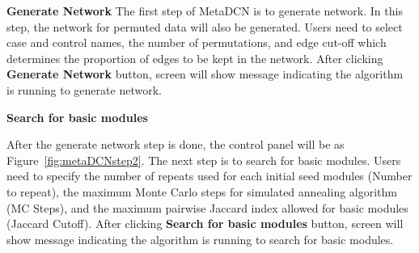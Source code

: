 \begin{steps}
\item \textbf{Generate Network}
The first step of MetaDCN is to generate network. In this step, the network for permuted data will also be generated. Users need to select case and control names, the number of permutations, and edge cut-off which determines the proportion of edges to be kept in the network. After clicking \textbf{Generate Network} button, screen will show message indicating the algorithm is running to generate network.


\item \textbf{Search for basic modules}

After the generate network step is done, the control panel will be as Figure~\ref{fig:metaDCNstep2}. The next step is to search for basic modules. Users need to specify the number of repeats used for each initial seed modules (Number to repeat), the maximum Monte Carlo steps for simulated annealing algorithm (MC Steps), and the maximum pairwise Jaccard index allowed for basic modules (Jaccard Cutoff). After clicking \textbf{Search for basic modules} button, screen will show message indicating the algorithm is running to search for basic modules.


\end{steps}
